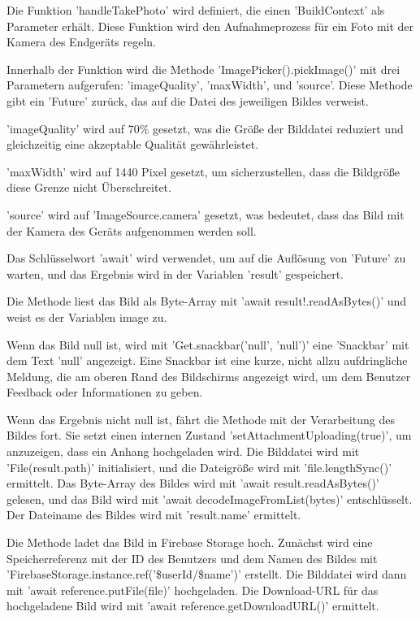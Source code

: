 Die Funktion 'handleTakePhoto' wird definiert, die einen 'BuildContext' als Parameter erhält. Diese Funktion wird den Aufnahmeprozess für ein Foto mit der Kamera des Endgeräts regeln.

Innerhalb der Funktion wird die Methode 'ImagePicker().pickImage()' mit drei Parametern aufgerufen: 'imageQuality', 'maxWidth', und 'source'. Diese Methode gibt ein 'Future' zurück, das auf die Datei des jeweiligen Bildes verweist.

'imageQuality' wird auf 70\% gesetzt, was die Größe der Bilddatei reduziert und gleichzeitig eine akzeptable Qualität gewährleistet.

'maxWidth' wird auf 1440 Pixel gesetzt, um sicherzustellen, dass die Bildgröße diese Grenze nicht Überschreitet.

'source' wird auf 'ImageSource.camera' gesetzt, was bedeutet, dass das Bild mit der Kamera des Geräts aufgenommen werden soll.

Das Schlüsselwort 'await' wird verwendet, um auf die Auflösung von 'Future' zu warten, und das Ergebnis wird in der Variablen 'result' gespeichert.

Die Methode liest das Bild als Byte-Array mit 'await result!.readAsBytes()' und weist es der Variablen image zu.

Wenn das Bild null ist, wird mit 'Get.snackbar('null', 'null')' eine 'Snackbar' mit dem Text 'null' angezeigt. Eine Snackbar ist eine kurze, nicht allzu aufdringliche Meldung, die am oberen Rand des Bildschirms angezeigt wird, um dem Benutzer Feedback oder Informationen zu geben.

Wenn das Ergebnis nicht null ist, fährt die Methode mit der Verarbeitung des Bildes fort.
Sie setzt einen internen Zustand 'setAttachmentUploading(true)', um anzuzeigen, dass ein Anhang hochgeladen wird.
Die Bilddatei wird mit 'File(result.path)' initialisiert, und die Dateigröße wird mit 'file.lengthSync()' ermittelt.
Das Byte-Array des Bildes wird mit 'await result.readAsBytes()' gelesen, und das Bild wird mit 'await decodeImageFromList(bytes)' entschlüsselt.
Der Dateiname des Bildes wird mit 'result.name' ermittelt.

Die Methode ladet das Bild in Firebase Storage hoch.
Zunächst wird eine Speicherreferenz mit der ID des Benutzers und dem Namen des Bildes mit 'FirebaseStorage.instance.ref('\$userId/\$name')'  erstellt.
Die Bilddatei wird dann mit 'await reference.putFile(file)' hochgeladen.
Die Download-URL für das hochgeladene Bild wird mit 'await reference.getDownloadURL()' ermittelt.

